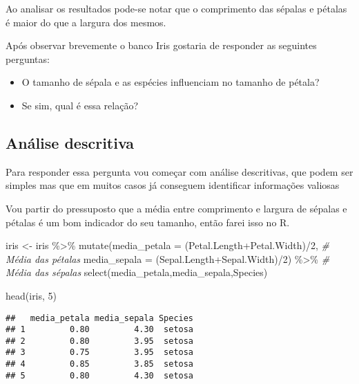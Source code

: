 \documentclass[
]{book}
\newenvironment{Shaded}{\begin{snugshade}}{\end{snugshade}}
\newcommand{\AttributeTok}[1]{\textcolor[rgb]{0.77,0.63,0.00}{#1}}
\newcommand{\CommentTok}[1]{\textcolor[rgb]{0.56,0.35,0.01}{\textit{#1}}}
\newcommand{\DecValTok}[1]{\textcolor[rgb]{0.00,0.00,0.81}{#1}}
\newcommand{\FunctionTok}[1]{\textcolor[rgb]{0.00,0.00,0.00}{#1}}
\newcommand{\NormalTok}[1]{#1}
\newcommand{\OtherTok}[1]{\textcolor[rgb]{0.56,0.35,0.01}{#1}}
\newcommand{\SpecialCharTok}[1]{\textcolor[rgb]{0.00,0.00,0.00}{#1}}
\providecommand{\tightlist}{%
  \setlength{\itemsep}{0pt}\setlength{\parskip}{0pt}}
\begin{document}
Ao analisar os resultados pode-se notar que o comprimento das sépalas e pétalas é maior do que a largura dos mesmos.

Após observar brevemente o banco Iris gostaria de responder as seguintes perguntas:

\begin{itemize}
\tightlist
\item
  O tamanho de sépala e as espécies influenciam no tamanho de pétala?
\item
  Se sim, qual é essa relação?
\end{itemize}

\hypertarget{anuxe1lise-descritiva}{%
\subsection{Análise descritiva}\label{anuxe1lise-descritiva}}

Para responder essa pergunta vou começar com análise descritivas, que podem ser simples mas que em muitos casos já conseguem identificar informações valiosas

Vou partir do pressuposto que a média entre comprimento e largura de sépalas e pétalas é um bom indicador do seu tamanho, então farei isso no R.

\begin{Shaded}
\begin{Highlighting}[]
\NormalTok{iris }\OtherTok{\textless{}{-}}\NormalTok{ iris }\SpecialCharTok{\%\textgreater{}\%}
  \FunctionTok{mutate}\NormalTok{(}\AttributeTok{media\_petala =}\NormalTok{ (Petal.Length}\SpecialCharTok{+}\NormalTok{Petal.Width)}\SpecialCharTok{/}\DecValTok{2}\NormalTok{, }\CommentTok{\# Média das pétalas}
         \AttributeTok{media\_sepala =}\NormalTok{ (Sepal.Length}\SpecialCharTok{+}\NormalTok{Sepal.Width)}\SpecialCharTok{/}\DecValTok{2}\NormalTok{) }\SpecialCharTok{\%\textgreater{}\%} \CommentTok{\# Média das sépalas}
  \FunctionTok{select}\NormalTok{(media\_petala,media\_sepala,Species)}

\FunctionTok{head}\NormalTok{(iris, }\DecValTok{5}\NormalTok{)}
\end{Highlighting}
\end{Shaded}

\begin{verbatim}
##   media_petala media_sepala Species
## 1         0.80         4.30  setosa
## 2         0.80         3.95  setosa
## 3         0.75         3.95  setosa
## 4         0.85         3.85  setosa
## 5         0.80         4.30  setosa
\end{verbatim}
\end{document}
